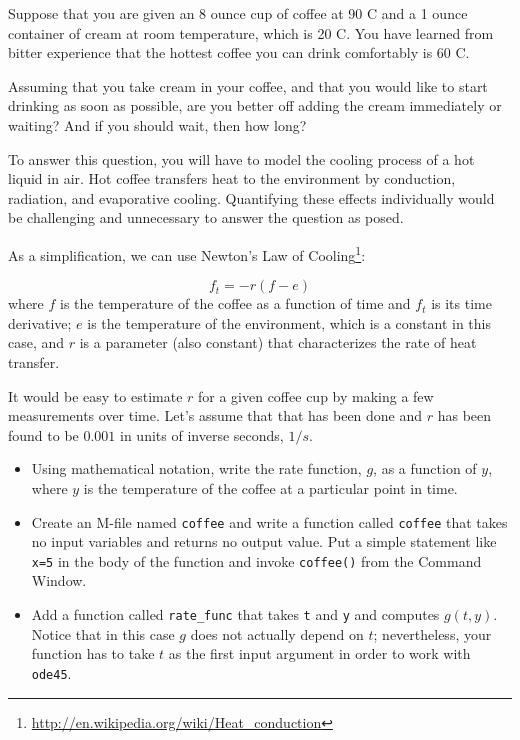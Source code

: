 \documentclass{book}
\begin{document}
\begin{ex}
Suppose that you are given an 8 ounce cup of coffee at 90 \degree C and
a 1 ounce container of cream at room temperature, which is 20 \degree C.
You have learned from bitter experience that the hottest coffee you
can drink comfortably is 60 \degree C.

Assuming that you take cream in your coffee, and that you would like
to start drinking as soon as possible, are you better off adding
the cream immediately or waiting? And if you should wait, then how
long?

To answer this question, you will have to model the cooling process
of a hot liquid in air. Hot coffee transfers heat to the environment
by conduction, radiation, and evaporative cooling. Quantifying these
effects individually would be challenging and unnecessary to answer
the question as posed.

As a simplification, we can use Newton's Law of
Cooling\footnote{\url{http://en.wikipedia.org/wiki/Heat_conduction}}:

\[ f_t = -r (f - e) \]
%
where $f$ is the temperature of the coffee as a function of time and
$f_t$ is its time derivative; $e$ is the temperature of the
environment, which is a constant in this case, and $r$ is a parameter
(also constant) that characterizes the rate of heat transfer.

It would be easy to estimate $r$ for a given coffee cup by making
a few measurements over time. Let's assume that that has been
done and $r$ has been found to be $0.001$ in units of inverse
seconds, $1/s$.

\begin{itemize}

\item Using mathematical notation, write the rate function, $g$,
as a function of $y$, where $y$ is the temperature of the
coffee at a particular point in time.

\item Create an M-file named {\tt coffee} and write a function
called {\tt coffee} that takes no input variables and returns no
output value. Put a simple statement like {\tt x=5} in the body
of the function and invoke {\tt coffee()} from the Command Window.

\item Add a function called
{\tt rate\_func} that takes {\tt t} and {\tt y} and computes
$g(t,y)$. Notice that in this case $g$ does not actually
depend on $t$; nevertheless, your function has to take $t$ as
the first input argument in order to work with {\tt ode45}.


\end{itemize}
\end{ex}
\end{document}
